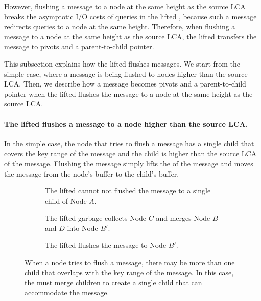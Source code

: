 However, flushing a \goto message to a node at the same height as the source
LCA breaks the asymptotic I/O costs of queries in the lifted \bedag,
because such a \goto message redirects queries to a node at the same height.
Therefore, when flushing a \goto message to a node at the same height as
the source LCA,
the lifted \bedag transfers the \goto message to
pivots and a parent-to-child pointer.

This subsection explains how the lifted \bedag flushes \goto messages.
We start from the simple case, where a \goto message is being flushed to nodes
higher than the source LCA.
Then, we describe how a \goto message becomes pivots and a parent-to-child
pointer
when the lifted \bedag flushes the \goto message to
a node at the same height as the source LCA.

\paragraph{The lifted \bedag flushes a \goto message to a node higher than
the source LCA.}
In the simple case, the node that tries to flush a \goto message has a single
child that covers the key range of the \goto message
and the child is higher than the source LCA of the \goto message.
Flushing the \goto message simply lifts the \dpre of the \goto message and moves
the \goto message from the node's buffer to the child's buffer.

\begin{figure}
    \begin{subfigure}{\textwidth}
        \centering
        
        \caption{\label{subfig:flush-1} The lifted \bedag cannot not flushed the
            \goto message to a single child of Node $A$.}
    \end{subfigure}
    \begin{subfigure}{\textwidth}
        \centering
        
        \caption{\label{subfig:flush-2} The lifted \bedag garbage collects Node
            $C$ and merges Node $B$ and $D$ into Node $B'$.}
    \end{subfigure}
    \begin{subfigure}{\textwidth}
        \centering
        
        \caption{\label{subfig:flush-3} The lifted \bedag flushes the \goto message
            to Node $B'$.}
    \end{subfigure}
    \caption[The \bedag merges children before flushing a \goto message]{\label{fig:flush}
        When a node tries to flush a \goto message, there may be more than
        one child that overlaps with the key range of the \goto message.
        In this case, the \bedag must merge children to create a single child
        that can accommodate the \goto message.}
\end{figure}

